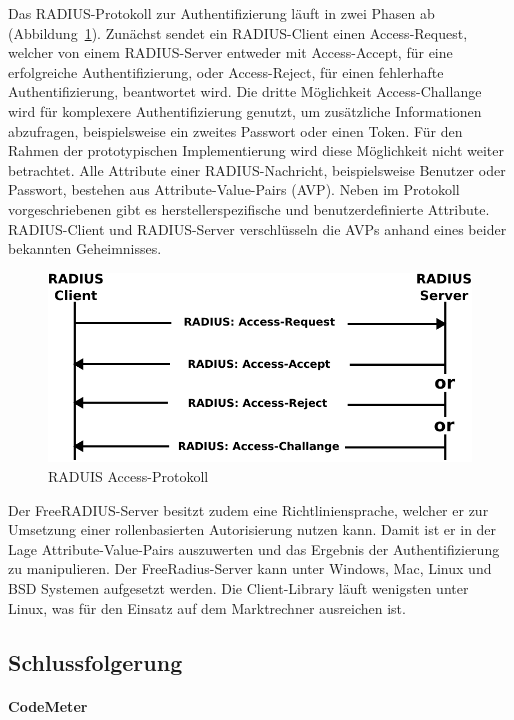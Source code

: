 \documentclass[11pt,a4paper]{report}
\begin{document}
Das RADIUS-Protokoll zur Authentifizierung läuft in zwei Phasen ab (Abbildung~\ref{fig:radius_access}). Zunächst sendet ein RADIUS-Client einen Access-Request, welcher von einem RADIUS-Server entweder mit Access-Accept, für eine erfolgreiche Authentifizierung, oder Access-Reject, für einen fehlerhafte Authentifizierung, beantwortet wird. Die dritte Möglichkeit Access-Challange wird für komplexere Authentifizierung genutzt, um zusätzliche Informationen abzufragen, beispielsweise ein zweites Passwort oder einen Token. Für den Rahmen der prototypischen Implementierung wird diese Möglichkeit nicht weiter betrachtet. Alle Attribute einer RADIUS-Nachricht, beispielsweise Benutzer oder Passwort, bestehen aus Attribute-Value-Pairs (AVP). Neben im Protokoll vorgeschriebenen gibt es herstellerspezifische und benutzerdefinierte Attribute. RADIUS-Client und RADIUS-Server verschlüsseln die AVPs anhand eines beider bekannten Geheimnisses.

\begin{figure}[htbp]
\centering
\includegraphics[scale=0.8]{images/RADIUS_access.pdf}
\caption{RADUIS Access-Protokoll}
\label{fig:radius_access}
\end{figure}

Der FreeRADIUS-Server besitzt zudem eine Richtliniensprache, welcher er zur Umsetzung einer rollenbasierten Autorisierung nutzen kann. Damit ist er in der Lage Attribute-Value-Pairs auszuwerten und das Ergebnis der Authentifizierung zu manipulieren. Der FreeRadius-Server kann unter Windows, Mac, Linux und BSD Systemen aufgesetzt werden. Die Client-Library läuft wenigsten unter Linux, was für den Einsatz auf dem Marktrechner ausreichen ist.

\subsection{Schlussfolgerung}

\paragraph{CodeMeter}
\end{document}
